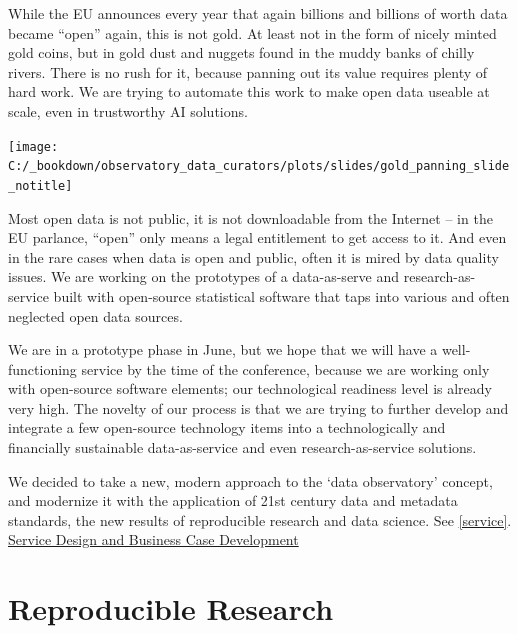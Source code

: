 \documentclass[
  a4paper,
  openany, a4paper, oneside]{book}
\begin{document}
While the EU announces every year that again billions and billions of worth data became ``open'' again, this is not gold. At least not in the form of nicely minted gold coins, but in gold dust and nuggets found in the muddy banks of chilly rivers. There is no rush for it, because panning out its value requires plenty of hard work. We are trying to automate this work to make open data useable at scale, even in trustworthy AI solutions.

\begin{center}\texttt{[image: C:/\_bookdown/observatory\_data\_curators/plots/slides/gold\_panning\_slide\_notitle]} \end{center}

Most open data is not public, it is not downloadable from the Internet -- in the EU parlance, ``open'' only means a legal entitlement to get access to it. And even in the rare cases when data is open and public, often it is mired by data quality issues. We are working on the prototypes of a data-as-serve and research-as-service built with open-source statistical software that taps into various and often neglected open data sources.

We are in a prototype phase in June, but we hope that we will have a well-functioning service by the time of the conference, because we are working only with open-source software elements; our technological readiness level is already very high. The novelty of our process is that we are trying to further develop and integrate a few open-source technology items into a technologically and financially sustainable data-as-service and even research-as-service solutions.

We decided to take a new, modern approach to the `data observatory' concept, and modernize it with the application of 21st century data and metadata standards, the new results of reproducible research and data science. See \ref{service}. \protect\hyperlink{service}{Service Design and Business Case Development}

\hypertarget{reproducible-research}{%
\section{Reproducible Research}\label{reproducible-research}}
\end{document}

